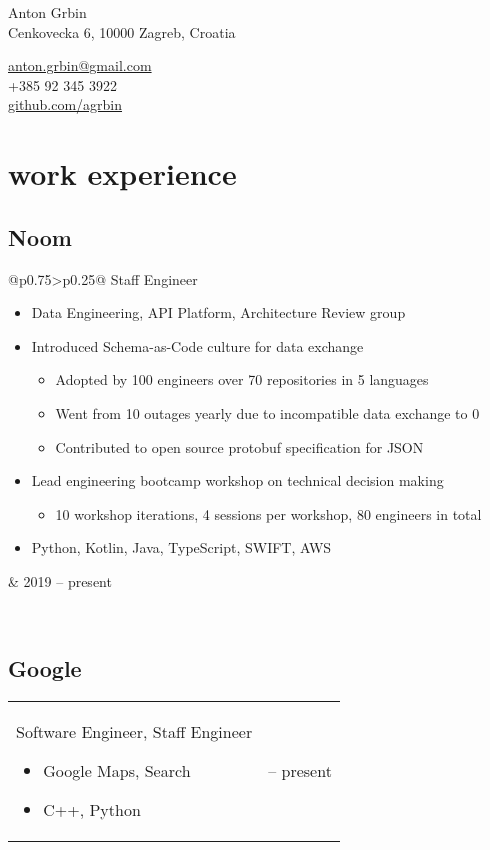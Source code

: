 \documentclass[a4paper]{article}
\makeatletter
\newlength{\tablewidth}
\newenvironment{period}[2]{%
\newcommand{\sarma}{#2}%
\setlength{\tablewidth}{\linewidth}
\addtolength{\tablewidth}{-2\tabcolsep}
\begin{tabular}{@{}p{0.75\tablewidth}>{\raggedleft\arraybackslash}p{0.25\tablewidth}@{}}%
#1 \newline
\begin{itemize}
}{%
\end{itemize} & \sarma \\%
\end{tabular}\\
}
\makeatother
\begin{document}
\fontfamily{\sfdefault}
\selectfont

\begin{minipage}{.5\textwidth}
\LARGE{Anton Grbin}\\
\normalsize{Cenkovecka 6, 10000 Zagreb, Croatia}
\end{minipage}%
\begin{minipage}{.5\textwidth}
\raggedleft
\href{mailto:anton.grbin@gmail.com}{anton.grbin@gmail.com} \\
+385 92 345 3922 \\
\href{https://github.com/agrbin}{github.com/agrbin}
\end{minipage}

\vspace{1em}

\section{work experience}

\subsection{Noom}
\begin{period}{Staff Engineer}{2019 -- present}
    \item Data Engineering, API Platform, Architecture Review group
    \item Introduced Schema-as-Code culture for data exchange
        \begin{itemize}
            \item Adopted by 100 engineers over 70 repositories in 5 languages
            \item Went from 10 outages yearly due to incompatible data exchange to 0
            \item Contributed to open source protobuf specification for JSON
        \end{itemize}
    \item Lead engineering bootcamp workshop on technical decision making
        \begin{itemize}
            \item 10 workshop iterations, 4 sessions per workshop, 80 engineers in total
        \end{itemize}
    \item Python, Kotlin, Java, TypeScript, SWIFT, AWS
\end{period}

\subsection{Google}
\begin{period}{Software Engineer, Staff Engineer}{2014 -- 2019}
    \item Google Maps, Search
    \item C++, Python
\end{period}
\end{document}
